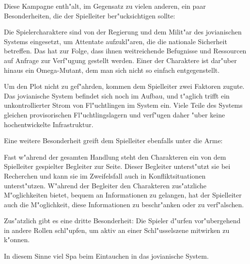 Diese Kampagne enth"alt, im Gegensatz zu vielen anderen, ein paar Besonderheiten, die der Spielleiter ber"ucksichtigen sollte:

Die Spielercharaktere sind von der Regierung und dem Milit"ar des jovianischen Systems eingesetzt, um Attentate aufzukl"aren, die die nationale Sicherheit betreffen. Das hat zur Folge, dass ihnen weitreichende Befugnisse und Ressourcen auf Anfrage zur Verf"ugung gestellt werden. Einer der Charaktere ist dar"uber hinaus ein Omega-Mutant, dem man sich nicht so einfach entgegenstellt.

Um den Plot nicht zu gef"ahrden, kommen dem Spielleiter zwei Faktoren zugute. Das jovianische System befindet sich noch im Aufbau, und t"aglich trifft ein unkontrollierter Strom von Fl"uchtlingen im System ein. Viele Teile des Systems gleichen provisorischen Fl"uchtlingslagern und verf"ugen daher "uber keine hochentwickelte Infrastruktur.

Eine weitere Besonderheit greift dem Spielleiter ebenfalls unter die Arme:

Fast w"ahrend der gesamten Handlung steht den Charakteren ein von dem Spielleiter gespielter Begleiter zur Seite. Dieser Begleiter unterst"utzt sie bei Recherchen und kann sie im Zweifelsfall auch in Konfliktsituationen unterst"utzen. W"ahrend der Begleiter den Charakteren zus"atzliche M"oglichkeiten bietet, bequem an Informationen zu gelangen, hat der Spielleiter auch die M"oglichkeit, diese Informationen zu beschr"anken oder zu verf"alschen.

Zus"atzlich gibt es eine dritte Besonderheit: Die Spieler d"urfen vor"ubergehend in andere Rollen schl"upfen, um aktiv an einer Schl"usselszene mitwirken zu k"onnen.

\vspace{1.5cm}
\begin{center}{\large{}In diesem Sinne viel Spa\3 beim Eintauchen in das jovianische System.}\end{center}

